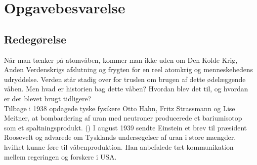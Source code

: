 \newpage
\section{Opgavebesvarelse}\label{sec:OpgaveBesvarelse}

\subsection{Redegørelse}\label{sec:Redegorsel}
Når man tænker på atomvåben, kommer man ikke uden om Den Kolde Krig, Anden Verdenskrigs afslutning og frygten for en reel atomkrig og menneskehedens udryddelse. Verden står stadig over for truslen om brugen af dette ødelæggende våben. Men hvad er historien bag dette våben? Hvordan blev det til, og hvordan er det blevet brugt tidligere? \\
Tilbage i 1938 opdagede tyske fysikere Otto Hahn, Fritz Strassmann og Lise Meitner, at bombardering af uran med neutroner producerede et bariumisotop som et spaltningsprodukt. (\cite{MaxPlanckInstitute}) I august 1939 sendte Einstein et brev til præsident Roosevelt og advarede om Tysklands undersøgelser af uran i store mængder, hvilket kunne føre til våbenproduktion. Han anbefalede tæt kommunikation mellem regeringen og forskere i USA.
